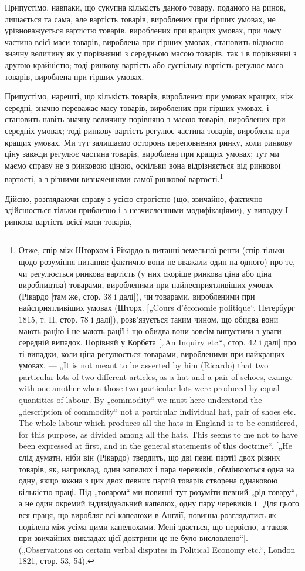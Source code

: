Припустімо, навпаки, що сукупна кількість даного товару,
поданого на ринок, лишається та сама, але вартість товарів,
вироблених при гірших умовах, не урівноважується вартістю
товарів, вироблених при кращих умовах, при чому частина всієї
маси товарів, вироблена при гірших умовах, становить відносно
значну величину як у порівнянні з середньою масою товарів,
так і в порівнянні з другою крайністю; тоді ринкову вартість
або суспільну вартість регулює маса товарів, вироблена при
гірших умовах.

Припустімо, нарешті, що кількість товарів, вироблених при
умовах кращих, ніж середні, значно переважає масу товарів, вироблених при гірших умовах, і становить
навіть значну величину порівняно з масою товарів, вироблених при середніх умовах; тоді ринкову
вартість регулює частина товарів, вироблена при
кращих умовах. Ми тут залишаємо осторонь переповнення ринку,
коли ринкову ціну завжди регулює частина товарів, вироблена
при кращих умовах; тут ми маємо справу не з ринковою ціною,
оскільки вона відрізняється від ринкової вартості, а з різними
визначеннями самої ринкової вартості.\footnote{
Отже, спір між Шторхом і Рікардо в питанні земельної ренти (спір
тільки щодо розуміння питання: фактично вони не вважали один на одного)
про те, чи регулюється ринкова вартість (у них скоріше ринкова ціна або
ціна виробництва) товарами, виробленими при найнесприятливіших умовах
(Рікардо [там же, стор. 38 і далі]), чи товарами, виробленими при найсприятливіших умовах (Шторх.
[„Cours d’économie politique“. Петербург 1815, т. II,
стор. 78 і далі]), розв’язується таким чином, що обидва вони мають рацію
і не мають рації і що обидва вони зовсім випустили з уваги середній випадок.
Порівняй у Корбета [„An Inquiry etc.“, стор. 42 і далі] про ті випадки, коли
ціна регулюється товарами, виробленими при найкращих умовах. — „It is not meant
to be asserted by him (Ricardo) that two particular lots of two different articles,
as a hat and a pair of schoes, exange with one another when those two particular
lots were produced by equal quantities of labour. By „commodity“ we must here
understand the „description of commodity“ not a particular individual hat, pair
of shoes etc. The whole labour which produces all the hats in England is to be
considered, for this purpose, as divided among all the hats. This seems to me not
to have been expressed at first, and in the general statements of this doctrine“. [„He
слід думати, ніби він (Рікардо) твердить, що дві певні партії двох різних товарів, як,
наприклад, один капелюх і пара черевиків, обмінюються одна на одну, якщо
кожна з цих двох певних партій товарів створена однаковою кількістю праці.
Під „товаром“ ми повинні тут розуміти певний „рід товару“, а не один окремий
індивідуальний капелюх, одну пару черевиків і~ Для цього вся праця, що виробляє всі капелюхи в
Англії, повинна розглядатись як поділена між усіма цими капелюхами. Мені здається, що первісно, а
також при звичайних викладах цієї
доктрини це не було висловлено“]. („Observations on certain verbal disputes in
Political Economy etc.“, London 1821, стор. 53, 54).
}

Дійсно, розглядаючи справу з усією строгістю (що, звичайно,
фактично здійснюється тільки приблизно і з незчисленними модифікаціями), у випадку I ринкова
вартість всієї маси товарів,
\parbreak{}  %
